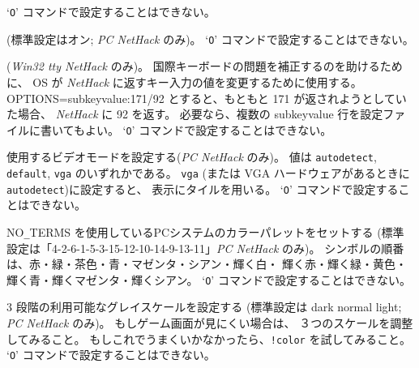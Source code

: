 `{\tt O}' コマンドで設定することはできない。
\item[\ib{soundcard}]
(標準設定はオン; {\it PC NetHack \/} のみ)。
`{\tt O}' コマンドで設定することはできない。
\item[\ib{subkeyvalue}]
({\it Win32 tty NetHack \/} のみ)。
国際キーボードの問題を補正するのを助けるために、
OS が {\it NetHack\/} に返すキー入力の値を変更するために使用する。
OPTIONS=subkeyvalue:171/92
とすると、もともと 171 が返されようとしていた場合、
{\it NetHack\/} に 92 を返す。
必要なら、複数の subkeyvalue 行を設定ファイルに書いてもよい。
`{\tt O}' コマンドで設定することはできない。
\item[\ib{video}]
使用するビデオモードを設定する({\it PC\/ NetHack\/} のみ)。
値は {\tt autodetect\/}, {\tt default\/}, {\tt vga\/} のいずれかである。
{\tt vga\/} (または VGA ハードウェアがあるときに{\tt autodetect\/})に設定すると、
表示にタイルを用いる。
`{\tt O}' コマンドで設定することはできない。
\item[\ib{videocolors}]
\begin{sloppypar}
NO\verb+_+TERMS を使用しているPCシステムのカラーパレットをセットする
(標準設定は「4-2-6-1-5-3-15-12-10-14-9-13-11」{\it PC\/ NetHack\/} のみ)。
シンボルの順番は、赤・緑・茶色・青・マゼンタ・シアン・輝く白・
輝く赤・輝く緑・黄色・輝く青・輝くマゼンタ・輝くシアン。
`{\tt O}' コマンドで設定することはできない。
\end{sloppypar}
\item[\ib{videoshades}]
3 段階の利用可能なグレイスケールを設定する
(標準設定は dark normal light; {\it PC\/ NetHack\/} のみ)。
もしゲーム画面が見にくい場合は、
３つのスケールを調整してみること。
もしこれでうまくいかなかったら、{\tt !color} を試してみること。
`{\tt O}' コマンドで設定することはできない。
\elist

